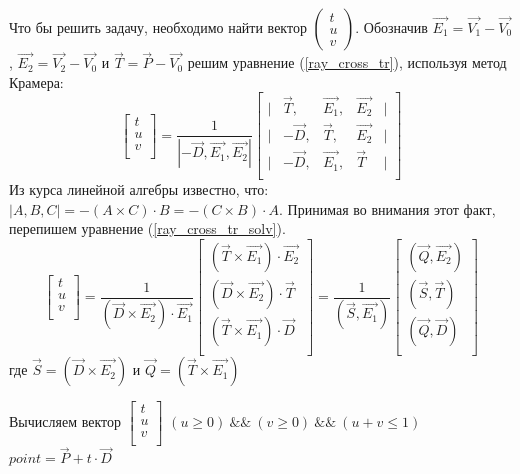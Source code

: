\documentclass[12pt, a4paper]{article}
\def\VEC#1#2#3{\left( \begin{array}{c} #1 \\ #2 \\ #3 \end{array} \right) }
\begin{document}
Что бы решить задачу, необходимо найти вектор $\VEC{t}{u}{v}$. Обозначив $\vec{E_1} = \vec{V_1} - \vec{V_0}$, $\vec{E_2} = \vec{V_2} - \vec{V_0}$ и $\vec{T} = \vec{P} - \vec{V_0}$ решим уравнение (\ref{ray_cross_tr}), используя метод Крамера:
\begin{equation}
\label{ray_cross_tr_solv}
\left[  
\begin{array}{c} t \\ u \\ v \\ \end{array}
\right] = 
\frac{1}{| -\vec{D}, \vec{E_1}, \vec{E_2}|} 
\left[  
	\begin{array}{lcccl}
	|& \vec{T} , & \vec{E_1}, &\vec{E_2} & | \\
	|&-\vec{D} , & \vec{T}  , &\vec{E_2} & | \\
	|&-\vec{D} , & \vec{E_1}, &\vec{T}   & | \\
	\end{array}
\right] 
\end{equation}
Из курса линейной алгебры известно, что: $|A, B, C| = - (A \times C) \cdot B = - (C \times B) \cdot A$. Принимая во внимания этот факт, перепишем уравнение (\ref{ray_cross_tr_solv}).
\begin{equation}
\label{ray_cross_tr_solv2}
\left[  
\begin{array}{c} t \\ u \\ v \\ \end{array}
\right] = 
\frac{1}{(\vec{D} \times \vec{E_2})\cdot \vec{E_1}} 
\left[  
	\begin{array}{c}
	(\vec{T} \times \vec{E_1}) \cdot \vec{E_2} \\
	(\vec{D} \times \vec{E_2}) \cdot \vec{T} \\
	(\vec{T} \times \vec{E_1}) \cdot \vec{D} \\
	\end{array}
\right] = 
\frac{1}{(\vec{S}, \vec{E_1})} 
\left[  
	\begin{array}{c}
	(\vec{Q}, \vec{E_2}) \\
	(\vec{S}, \vec{T}) \\	
	(\vec{Q}, \vec{D}) \\	
	\end{array}
\right]
\end{equation}
где $\vec{S} = (\vec{D} \times \vec{E_2})$ и $\vec{Q} = (\vec{T} \times \vec{E_1})$

\begin{codebox}
\li Вычисляем вектор $\left[ \begin{array}{c} t \\ u \\ v \\ \end{array} \right]$
\li \If $(u \geq 0) \ \&\& \ (v \geq 0) \ \&\& \ (u + v \leq 1)$
\li \Then $point = \vec{P} + t \cdot \vec{D}$
\end{codebox}
\end{document}

